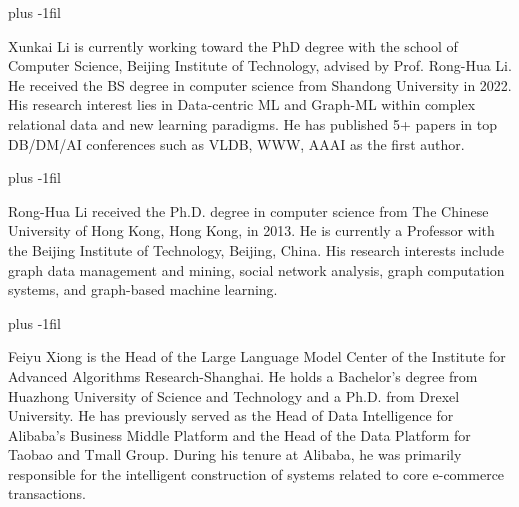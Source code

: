 \documentclass[lettersize,journal]{IEEEtran}
\begin{document}
\baselineskip plus -1fil

\begin{IEEEbiography}{Xunkai Li} is currently working toward the PhD degree with the school of Computer Science, Beijing Institute of Technology, advised by Prof. Rong-Hua Li. He received the BS degree in computer science from Shandong University in 2022. His research interest lies in Data-centric ML and Graph-ML within complex relational data and new learning paradigms. He has published 5+ papers in top DB/DM/AI conferences such as VLDB, WWW, AAAI as the first author.
\end{IEEEbiography}

 \baselineskip plus -1fil
 
\begin{IEEEbiography}{Rong-Hua Li} received the Ph.D. degree in computer science from The Chinese University of Hong Kong, Hong Kong, in 2013. He is currently a Professor with the Beijing Institute of Technology, Beijing, China. His research interests include graph data management and mining, social network analysis, graph computation systems, and graph-based machine learning.
\end{IEEEbiography}

\baselineskip plus -1fil

\begin{IEEEbiography}{Feiyu Xiong} is the Head of the Large Language Model Center of the Institute for Advanced Algorithms Research-Shanghai. He holds a Bachelor's degree from Huazhong University of Science and Technology and a Ph.D. from Drexel University. He has previously served as the Head of Data Intelligence for Alibaba's Business Middle Platform and the Head of the Data Platform for Taobao and Tmall Group. During his tenure at Alibaba, he was primarily responsible for the intelligent construction of systems related to core e-commerce transactions.
\end{IEEEbiography}
\end{document}
